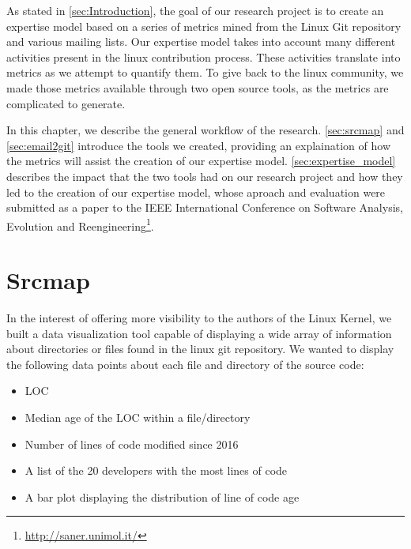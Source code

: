 \label{sec:Theme1}



As stated in \autoref{sec:Introduction}, the goal of our research project is to create an expertise model based on a series of metrics mined from the Linux Git repository and various mailing lists. 
Our expertise model takes into account many different activities present in the linux contribution process. These activities translate into metrics as we attempt to quantify them. To give back to the linux community, we made those metrics available through two open source tools, as the metrics are complicated to generate.  

In this chapter, we describe the general workflow of the research. 
\autoref{sec:srcmap} and \autoref{sec:email2git} introduce the tools we created, providing an explaination of how the metrics will assist the creation of our expertise model. \autoref{sec:expertise_model} describes the impact that the two tools had on our research project and how they led to the creation of our expertise model, whose aproach and evaluation were submitted as a paper to the IEEE International Conference on Software Analysis, Evolution and Reengineering\footnote{\url{http://saner.unimol.it/}}.





\section{Srcmap}
\label{sec:srcmap}

In the interest of offering more visibility to the authors of the Linux Kernel, we built a data visualization tool capable of displaying a wide array of information about directories or files found in the linux git repository. We wanted to display the following data points about each file and directory of the source code:

\begin{itemize}
	\item \ac{LOC}
	\item Median age of the \ac{LOC} within a file/directory
	\item Number of lines of code modified since 2016
	\item A list of the 20 developers with the most lines of code
	\item A bar plot displaying the distribution of line of code age
\end{itemize}


